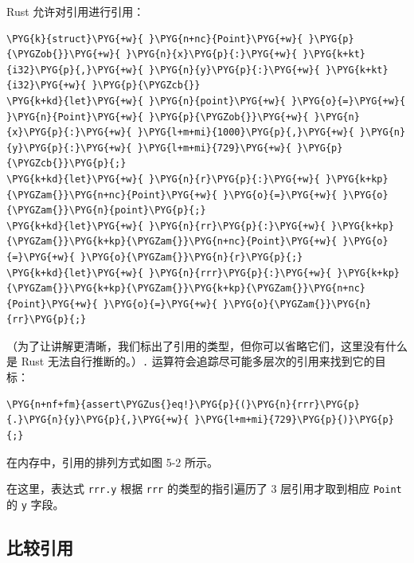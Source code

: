 Rust 允许对引用进行引用：

\begin{Verbatim}[commandchars=\\\{\},breaklines=true,breakanywhere=true,fontsize=\codefont,xleftmargin=17bp]
\PYG{k}{struct}\PYG{+w}{ }\PYG{n+nc}{Point}\PYG{+w}{ }\PYG{p}{\PYGZob{}}\PYG{+w}{ }\PYG{n}{x}\PYG{p}{:}\PYG{+w}{ }\PYG{k+kt}{i32}\PYG{p}{,}\PYG{+w}{ }\PYG{n}{y}\PYG{p}{:}\PYG{+w}{ }\PYG{k+kt}{i32}\PYG{+w}{ }\PYG{p}{\PYGZcb{}}
\PYG{k+kd}{let}\PYG{+w}{ }\PYG{n}{point}\PYG{+w}{ }\PYG{o}{=}\PYG{+w}{ }\PYG{n}{Point}\PYG{+w}{ }\PYG{p}{\PYGZob{}}\PYG{+w}{ }\PYG{n}{x}\PYG{p}{:}\PYG{+w}{ }\PYG{l+m+mi}{1000}\PYG{p}{,}\PYG{+w}{ }\PYG{n}{y}\PYG{p}{:}\PYG{+w}{ }\PYG{l+m+mi}{729}\PYG{+w}{ }\PYG{p}{\PYGZcb{}}\PYG{p}{;}
\PYG{k+kd}{let}\PYG{+w}{ }\PYG{n}{r}\PYG{p}{:}\PYG{+w}{ }\PYG{k+kp}{\PYGZam{}}\PYG{n+nc}{Point}\PYG{+w}{ }\PYG{o}{=}\PYG{+w}{ }\PYG{o}{\PYGZam{}}\PYG{n}{point}\PYG{p}{;}
\PYG{k+kd}{let}\PYG{+w}{ }\PYG{n}{rr}\PYG{p}{:}\PYG{+w}{ }\PYG{k+kp}{\PYGZam{}}\PYG{k+kp}{\PYGZam{}}\PYG{n+nc}{Point}\PYG{+w}{ }\PYG{o}{=}\PYG{+w}{ }\PYG{o}{\PYGZam{}}\PYG{n}{r}\PYG{p}{;}
\PYG{k+kd}{let}\PYG{+w}{ }\PYG{n}{rrr}\PYG{p}{:}\PYG{+w}{ }\PYG{k+kp}{\PYGZam{}}\PYG{k+kp}{\PYGZam{}}\PYG{k+kp}{\PYGZam{}}\PYG{n+nc}{Point}\PYG{+w}{ }\PYG{o}{=}\PYG{+w}{ }\PYG{o}{\PYGZam{}}\PYG{n}{rr}\PYG{p}{;}
\end{Verbatim}

（为了让讲解更清晰，我们标出了引用的类型，但你可以省略它们，这里没有什么是 Rust 无法自行推断的。）\texttt{.} 运算符会追踪尽可能多层次的引用来找到它的目标：

\begin{Verbatim}[commandchars=\\\{\},breaklines=true,breakanywhere=true,fontsize=\codefont,xleftmargin=17bp]
\PYG{n+nf+fm}{assert\PYGZus{}eq!}\PYG{p}{(}\PYG{n}{rrr}\PYG{p}{.}\PYG{n}{y}\PYG{p}{,}\PYG{+w}{ }\PYG{l+m+mi}{729}\PYG{p}{)}\PYG{p}{;}
\end{Verbatim}

在内存中，引用的排列方式如图 5-2 所示。


在这里，表达式 \texttt{rrr.y} 根据 \texttt{rrr} 的类型的指引遍历了 3 层引用才取到相应 \texttt{Point} 的 \texttt{y} 字段。

\subsection{比较引用}

